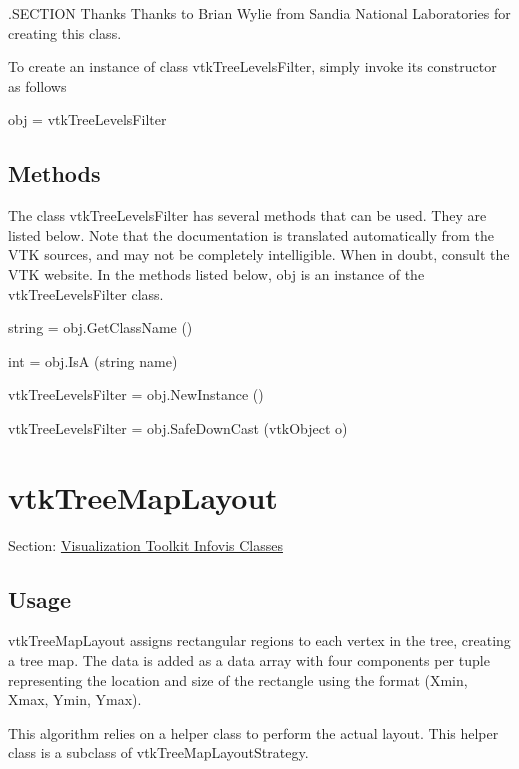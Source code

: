 .S\-E\-C\-T\-I\-O\-N Thanks Thanks to Brian Wylie from Sandia National Laboratories for creating this class.

To create an instance of class vtk\-Tree\-Levels\-Filter, simply invoke its constructor as follows \begin{DoxyVerb}  obj = vtkTreeLevelsFilter
\end{DoxyVerb}
 \hypertarget{vtkwidgets_vtkxyplotwidget_Methods}{}\subsection{Methods}\label{vtkwidgets_vtkxyplotwidget_Methods}
The class vtk\-Tree\-Levels\-Filter has several methods that can be used. They are listed below. Note that the documentation is translated automatically from the V\-T\-K sources, and may not be completely intelligible. When in doubt, consult the V\-T\-K website. In the methods listed below, {\ttfamily obj} is an instance of the vtk\-Tree\-Levels\-Filter class. 
\begin{DoxyItemize}
\item {\ttfamily string = obj.\-Get\-Class\-Name ()}  
\item {\ttfamily int = obj.\-Is\-A (string name)}  
\item {\ttfamily vtk\-Tree\-Levels\-Filter = obj.\-New\-Instance ()}  
\item {\ttfamily vtk\-Tree\-Levels\-Filter = obj.\-Safe\-Down\-Cast (vtk\-Object o)}  
\end{DoxyItemize}\hypertarget{vtkinfovis_vtktreemaplayout}{}\section{vtk\-Tree\-Map\-Layout}\label{vtkinfovis_vtktreemaplayout}
Section\-: \hyperlink{sec_vtkinfovis}{Visualization Toolkit Infovis Classes} \hypertarget{vtkwidgets_vtkxyplotwidget_Usage}{}\subsection{Usage}\label{vtkwidgets_vtkxyplotwidget_Usage}
vtk\-Tree\-Map\-Layout assigns rectangular regions to each vertex in the tree, creating a tree map. The data is added as a data array with four components per tuple representing the location and size of the rectangle using the format (Xmin, Xmax, Ymin, Ymax).

This algorithm relies on a helper class to perform the actual layout. This helper class is a subclass of vtk\-Tree\-Map\-Layout\-Strategy.

